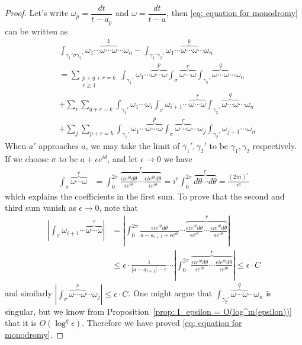 \begin{proof}
Let's write $\omega_p=\dfrac{dt}{t-a_p}$ and $\omega=\dfrac{dt}{t-a}$, then \eqref{eq: equation for monodromy} can be written as
\begin{align*}
&\int_{\gamma_1'\sigma\gamma_2'}\omega_1\cdots\overbrace{\omega\cdots\omega}^k\cdots\omega_n-\int_{\gamma_1'\gamma_2'}\omega_1\cdots\overbrace{\omega\cdots\omega}^k\cdots\omega_n\\
&=\sum_{\substack{p+q+r=k\\r\geq1}}\int_{\gamma_1'}\omega_1\cdots\overbrace{\omega\cdots\omega}^p\int_{\sigma}\overbrace{\omega\cdots\omega}^r\int_{\gamma_2'}\overbrace{\omega\cdots\omega}^q\cdots\omega_n\\
&+\sum_i\sum_{q+r=k}\int_{\gamma_1'}\omega_1\cdots\omega_i\int_{\sigma}\omega_{i+1}\cdots\overbrace{\omega\cdots\omega}^r\int_{\gamma_2'}\overbrace{\omega\cdots\omega}^q\cdots\omega_n\\
&+\sum_j\sum_{p+r=k}\int_{\gamma_1'}\omega_1\cdots\overbrace{\omega\cdots\omega}^p\int_{\sigma}\overbrace{\omega\cdots\omega}^r\cdots\omega_j\int_{\gamma_2'}\omega_{j+1}\cdots\omega_n
\end{align*}
When $a'$ approaches $a$, we may take the limit of $\gamma_1',\gamma_2'$ to be $\gamma_1,\gamma_2$ respectively. If we choose $\sigma$ to be $a+\epsilon e^{i\theta}$, and let $\epsilon\to0$ we have
\begin{align*}
\int_{\sigma}\overbrace{\omega\cdots\omega}^r&=\int_0^{2\pi}\overbrace{\frac{\epsilon ie^{i\theta}d\theta}{\epsilon e^{i\theta}}\cdots\frac{\epsilon ie^{i\theta}d\theta}{\epsilon e^{i\theta}}}^r=i^r\int_0^{2\pi}\overbrace{d\theta\cdots d\theta}^r=\frac{(2\pi i)^r}{r!}
\end{align*}
which explains the coefficients in the first sum. To prove that the second and third sum vanish as $\epsilon\to0$, note that
\begin{align*}
\left|\int_{\sigma}\omega_{i+1}\cdots\overbrace{\omega\cdots\omega}^r\right|&=\left|\int_{0}^{2\pi}\frac{\epsilon ie^{i\theta}d\theta}{a-a_{i+1}+\epsilon e^{i\theta}}\cdots\overbrace{\frac{\epsilon ie^{i\theta}d\theta}{\epsilon e^{i\theta}}\cdots\frac{\epsilon ie^{i\theta}d\theta}{\epsilon e^{i\theta}}}^r\right|\\
&\leq\epsilon\cdot\frac{1}{|a-a_{i+1}|-\epsilon}\cdots\left|\int_0^{2\pi}\overbrace{\frac{\epsilon ie^{i\theta}d\theta}{\epsilon e^{i\theta}}\cdots\frac{\epsilon ie^{i\theta}d\theta}{\epsilon e^{i\theta}}}^r\right|\leq\epsilon\cdot C
\end{align*}
and similarly $\displaystyle\left|\int_{\sigma}\overbrace{\omega\cdots\omega}^r\cdots\omega_j\right|\leq\epsilon\cdot C$. One might argue that $\displaystyle\int_{\gamma_2'}\overbrace{\omega\cdots\omega}^q\cdots\omega_n$ is singular, but we know from Proposition~\ref{prop: I_epsilon = O(log^m(epsilon))} that it is $O(\log^q\epsilon)$. Therefore we have proved \eqref{eq: equation for monodromy}.
\end{proof}

